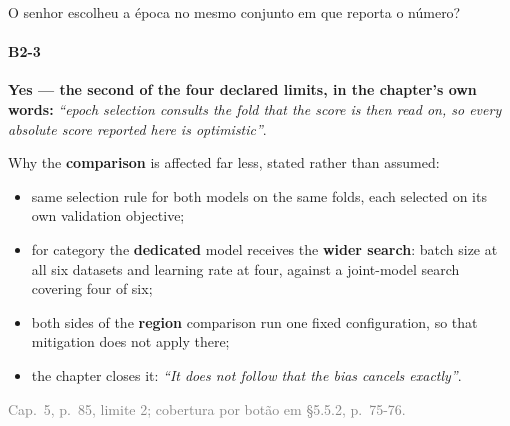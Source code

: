 \documentclass{beamer}
\begin{document}
\begin{frame}[noframenumbering]{O senhor escolheu a época no mesmo conjunto em que reporta o número?}
    \framesubtitle{B2-3}
    \hypertarget{b23}{}
    \small
    \textcolor{alert}{\textbf{Yes --- the second of the four declared limits, in the chapter's own words:}} \textit{``epoch selection consults the fold that the score is then read on, so every absolute score reported here is optimistic''}.

    Why the \textbf{comparison} is affected far less, stated rather than assumed:
    \begin{itemize}\setlength{\itemsep}{0pt}\setlength{\parskip}{0pt}
        \item same selection rule for both models on the same folds, each selected on its own validation objective;
        \item for category the \textbf{dedicated} model receives the \textbf{wider search}: batch size at all six datasets and learning rate at four, against a joint-model search covering four of six;
        \item both sides of the \textbf{region} comparison run one fixed configuration, so that mitigation does not apply there;
        \item the chapter closes it: \textit{``It does not follow that the bias cancels exactly''}.
    \end{itemize}
    \vfill
    {\scriptsize
    \begin{minipage}[b]{0.775\linewidth}\raggedright\textcolor{gray}{Cap.~5, p.~85, limite 2; cobertura por botão em §5.5.2, p.~75-76.}\end{minipage}\hfill
    \begin{minipage}[b]{0.20\linewidth}\raggedleft \hyperlink{b0}{}\end{minipage}}
\end{frame}
\end{document}
